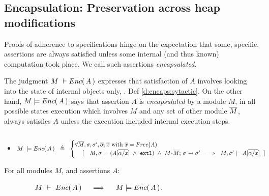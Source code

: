  
\subsection{Encapsulation: Preservation across heap modifications}
\label{s:preserve:encaps}
 
Proofs of adherence to {\SpecLang specifications  hinge on the expectation that some,  specific, assertions are always satisfied unless some 
} internal (and thus known) computation took place. 
{We call such assertions   \emph{encapsulated}.}
 

The judgment $M\ \vdash {\ensuremath Enc(\, A\, )}$  expresses that satisfaction of $A$ involves looking into the state of  
internal objects only,  \cf. Def \ref{d:encaps:sytactic}.
{On the other hand, $M  \models {\ensuremath Enc(\, A\, )}$ says that assertion $A$  is  \emph{encapsulated} by a module $M$, \ie in all possible states %
execution which involves $M$ and any set of other module $\overline{M}$, always satisfies  $A$  unless the execution  included internal execution steps}.
 

\begin{definition} $~$ \\
\label{d:encaps}
\begin{itemize}
\item
$ %
    M\ \models \encaps{A}\ \   \triangleq  \ \   
    \begin{cases}
     \forall \Mtwo, \sigma, \sigma',  \overline{\alpha}, \overline{x} \mbox{ with } \overline{x}=Free(A)\\ %
   \ \ \ \  [\ \ \  \satisfiesA{M}{\sigma}{({A[{\overline {\alpha/x}}]} \ \wedge\ \externalexec)}\  \wedge\ { \leadstoBounded {M\madd\Mtwo}  {\sigma}{\sigma'}} %
   \ \ \Longrightarrow\ \ 
   {M},{\sigma'}\models{A[{\overline {\alpha/x}}]} \ \  ]
    \end{cases}
 $%
 \end{itemize}
  \end{definition}
  
 
  \begin{lemma}
\label{lem:encap-soundness}
For all modules $M$, and assertions $A$: 

$\strut \hspace{1.5cm} M\ \vdash\ {Enc(\, A\, )} \ \ \ \ \Longrightarrow\ \ \ \ M \models {\ensuremath Enc(\, A\, )}$.
\end{lemma}

